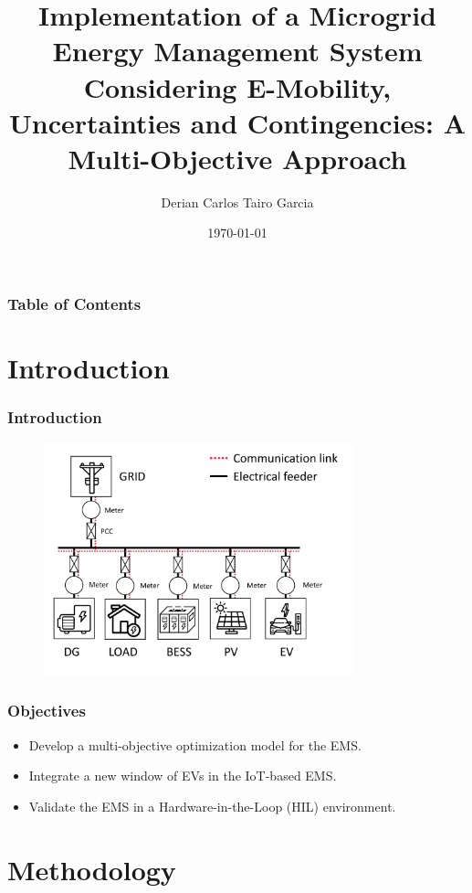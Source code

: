 \documentclass[10pt, aspectratio=1610]{beamer}
\title{Implementation of a Microgrid Energy Management System Considering 
E-Mobility, Uncertainties and Contingencies: A Multi-Objective Approach}
\author[Derian Tairo]{Derian Carlos Tairo Garcia \\
    \text{d255905@dac.unicamp.br}}
\date{\today}
\begin{document}
    
\begin{frame}
    \titlepage
\end{frame}

\begin{frame}
    \frametitle{Table of Contents}
    \tableofcontents
\end{frame}

\section{Introduction}

\begin{frame}
    \frametitle{Introduction}
    \begin{figure}
        \includegraphics[width = 0.8\textwidth]{../Figures/Microgrid_example.pdf}
    \end{figure}

\end{frame}



\begin{frame}
    \frametitle{Objectives}
    \begin{itemize}[<+->]
        \item Develop a multi-objective optimization model for the EMS. 
        \item Integrate a new window of EVs in the IoT-based EMS.
        \item Validate the EMS in a Hardware-in-the-Loop (HIL) environment.
    \end{itemize}
\end{frame}


\section{Methodology}
\end{document}
